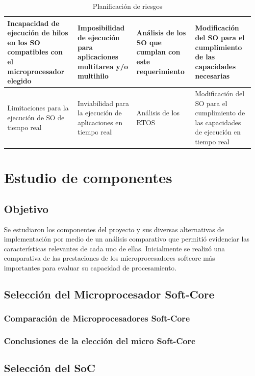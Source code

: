 \begin{table}[!h]
\begin{tabular}{ p{2.5cm} p{9cm} p{2cm} p{2cm} }
		\hline
		Incapacidad de ejecución de hilos en los SO compatibles con el microprocesador elegido &  Imposibilidad de ejecución para aplicaciones multitarea y/o multihilo & Análisis de los SO que cumplan con este requerimiento & Modificación del SO para el cumplimiento de las capacidades necesarias\\
		\hline
		Limitaciones para la ejecución de SO de tiempo real& Inviabilidad para la ejecución de aplicaciones en tiempo real & Análisis de los RTOS & Modificación del SO  para el cumplimiento de las capacidades de ejecución en tiempo real \\
		\hline
		\end{tabular}
		\caption{Planificación de riesgos}
		\label{tab:planificación}
		\end{table}
		
	\newpage	
	\section{Estudio de componentes}
		
			\subsection{Objetivo}
			Se estudiaron los componentes del proyecto y sus diversas alternativas de implementación por medio de un análisis comparativo que permitió evidenciar
			las características relevantes de cada uno de ellas. Inicialmente se realizó una comparativa de las prestaciones de los microprocesadores softcore
			más importantes para evaluar su capacidad de procesamiento. 
			
			\subsection{Selección del Microprocesador Soft-Core}
		
				\subsubsection{Comparación de Microprocesadores Soft-Core} 
	
				\subsubsection{Conclusiones de la elección del micro Soft-Core}
					 			
 			\subsection{Selección del SoC}
